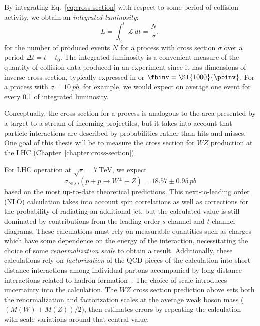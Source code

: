 By integrating Eq.~\ref{eq:cross-section} with respect to some period of collision activity, we obtain an \emph{integrated luminosity}:
\begin{equation}
  L = \int_{t_0}^{t} \mathcal{L}\,dt = \frac{N}{\sigma},
\end{equation}
for the number of produced events $N$ for a process with cross section $\sigma$ over a period $\Delta t = t - t_0$.  The integrated luminosity is a convenient measure of the quantity of collision data produced in an experiment since it has dimensions of inverse cross section, typically expressed in \pbinv or $\fbinv = \SI{1000}{\pbinv}$.  For a process with $\sigma = \SI{10}{pb}$, for example, we would expect on average one event for every \SI{0.1}{\pbinv} of integrated luminosity.

Conceptually, the cross section for a process is analogous to the area presented by a target to a stream of incoming projectiles, but it takes into account that particle interactions are described by probabilities rather than hits and misses.  One goal of this thesis will be to measure the cross section for $WZ$ production at the LHC (Chapter~\ref{chapter:cross-section}).

For LHC operation at $\sqrt{s} = \SI{7}{\TeV}$, we expect~\cite{Campbell:2011bn}
\begin{equation}
  \label{eq:predicted-cross-section}
  \sigma_\text{NLO}(p + p \to W^\pm + Z) = 18.57 \pm 0.95\,\si{pb}
\end{equation}
based on the most up-to-date theoretical predictions.  This next-to-leading order (NLO) calculation takes into account spin correlations as well as corrections for the probability of radiating an additional jet, but the calculated value is still dominated by contributions from the leading order $s$-channel and $t$-channel diagrams.  These calculations must rely on measurable quantities such as charges which have some dependence on the energy of the interaction, necessitating the choice of some \emph{renormalization scale} to obtain a result.  Additionally, these calculations rely on \emph{factorization} of the QCD pieces of the calculation into short-distance interactions among individual partons accompanied by long-distance interactions related to hadron formation~\cite{Tung:2009}.  The choice of scale introduces uncertainty into the calculation.  The $WZ$ cross section prediction above sets both the renormalization and factorization scales at the average weak boson mass ($(M(W) + M(Z)) / 2$), then estimates errors by repeating the calculation with scale variations around that central value.

